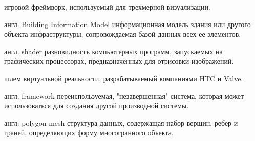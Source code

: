 ﻿

\begin{rglossary}
    {игровой фреймворк, используемый для трехмерной визуализации.\cite{docUnity}}

    {англ. Building Information Model}
    {информационная модель здания или другого объекта инфраструктуры,
    сопровождаемая базой данных всех ее элементов.}

    {англ. shader}
    {разновидность компьютерных программ, запускаемых на графических процессорах,
    предназначенных для отрисовки изображений.}

    {шлем виртуальной реальности, разрабатываемый компаниями HTC и Valve.}

    {англ. framework}
    {переиспользуемая, "незавершенная" система,
    которая может использоваться для создания другой производной системы.\cite{Framework}}

    {англ. polygon mesh}
    {структура данных, содержащая набор вершин, ребер и граней,
    определяющих форму многогранного объекта.}
\end{rglossary}